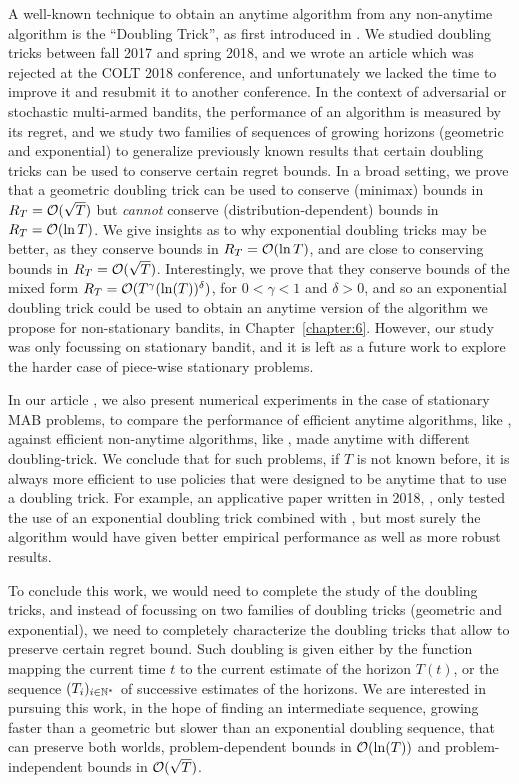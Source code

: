A well-known technique to obtain an anytime algorithm from any non-anytime algorithm is the ``Doubling Trick'', as first introduced in \cite{CesaLugosi06}.
We studied doubling tricks between fall 2017 and spring 2018, and we wrote an article \cite{Besson2018DoublingTricks} which was rejected at the COLT 2018 conference, and unfortunately we lacked the time to improve it and resubmit it to another conference.
%
In the context of adversarial or stochastic multi-armed bandits,
the performance of an algorithm is measured by its regret,
and we study two families of sequences of growing horizons (geometric and exponential)
to generalize previously known results that certain doubling tricks can be used to conserve certain regret bounds.
In a broad setting, we prove that a geometric doubling trick can be used to conserve (minimax) bounds in $R_T = \mathcal{O}(\sqrt{T})$ but \emph{cannot} conserve (distribution-dependent) bounds in $R_T = \mathcal{O}(\ln T)$.
We give insights as to why exponential doubling tricks may be better, as they conserve bounds in $R_T = \mathcal{O}(\ln T)$, and are close to conserving bounds in $R_T = \mathcal{O}(\sqrt{T})$.
Interestingly, we prove that they conserve bounds of the mixed form $R_T = \mathcal{O}(T^{\gamma} (\ln(T))^{\delta})$, for $0<\gamma<1$ and $\delta>0$, and so an exponential doubling trick could be used to obtain an anytime version of the algorithm we propose for non-stationary bandits, \GLRklUCB{} in Chapter~\ref{chapter:6}.
However, our study was only focussing on stationary bandit, and it is left as a future work to explore the harder case of piece-wise stationary problems.

In our article \cite{Besson2018DoublingTricks}, we also present numerical experiments in the case of stationary MAB problems, to compare the performance of efficient anytime algorithms, like \klUCB, against efficient non-anytime algorithms, like \KLUCBpp, made anytime with different doubling-trick.
We conclude that for such problems, if $T$ is not known before, it is always more efficient to use policies that were designed to be anytime that to use a doubling trick.
For example, an applicative paper written in 2018, \cite{li2019useDoublingTrick}, only tested the use of an exponential doubling trick combined with \KLUCBpp, but most surely the \klUCB{} algorithm would have given better empirical performance as well as more robust results.

To conclude this work, we would need to complete the study of the doubling tricks, and instead of focussing on two families of doubling tricks (geometric and exponential), we need to completely characterize the doubling tricks that allow to preserve certain regret bound.
Such doubling is given either by the function mapping the current time $t$ to the current estimate of the horizon $T(t)$, or the sequence $(T_i)_{i\in\mathbb{N}^*}$ of successive estimates of the horizons.
We are interested in pursuing this work, in the hope of finding an intermediate sequence, growing faster than a geometric but slower than an exponential doubling sequence, that can preserve both worlds, problem-dependent bounds in $\mathcal{O}(\ln(T))$ and problem-independent bounds in $\mathcal{O}(\sqrt{T})$.
